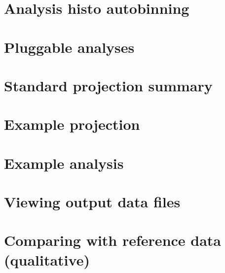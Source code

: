 \documentclass{JHEP3}
\begin{document}
\section{Analysis histo autobinning}
\section{Pluggable analyses}
\section{Standard projection summary}
\section{Example projection}
\section{Example analysis}
\section{Viewing output data files}
\section{Comparing with reference data (qualitative)}


\end{document}
